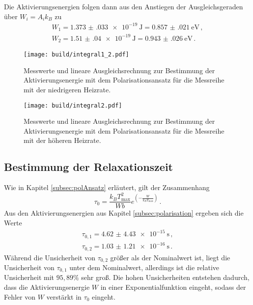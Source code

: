 Die Aktivierungsenergien folgen dann aus den Anstiegen der
Ausgleichsgeraden über $W_i=A_i k_B$ zu
\begin{align*}
	W_1=\SI{1.373(033)e-19}{\joule}=\SI{0.857(021)}{\eV} \,, \\
	W_2=\SI{1.51(04)e-19}{\joule}=\SI{0.943(026)}{\eV} \,.
\end{align*}

\begin{figure}
  \centering
  \texttt{[image: build/integral1\_2.pdf]}
  \caption{Messwerte und lineare Ausgleichsrechnung zur Bestimmung der Aktivierungsenergie mit dem Polarisationsansatz für
  die Messreihe mit der niedrigeren Heizrate.}
  \label{fig:integral1_2}
\end{figure}
\begin{figure}
  \centering
  \texttt{[image: build/integral2.pdf]}
  \caption{Messwerte und lineare Ausgleichsrechnung zur Bestimmung der Aktivierungsenergie mit dem Polarisationsansatz für
  die Messreihe mit der höheren Heizrate.}
  \label{fig:integral2}
\end{figure}

\subsection{Bestimmung der Relaxationszeit}
\label{subsec:relax}

Wie in Kapitel \ref{subsec:polAnsatz} erläutert, gilt der Zusammenhang
\begin{equation*}
	\tau_0=\frac{k_B T_{\text{max}}^2}{W b} e^{\left(-\frac{W}{k_B T_{\text{max}}}\right)} \,.
\end{equation*}
Aus den Aktivierungsenergien aus Kapitel \ref{subsec:polarisation} ergeben sich die Werte
\begin{align*}
	\tau_{0,1}=\SI{4.62(443)e-15}{\second} \,, \\
	\tau_{0,2}=\SI{1.03(121)e-16}{\second} \,.
\end{align*}
Während die Unsicherheit von $\tau_{0,2}$ größer als der Nominalwert ist, liegt die Unsicherheit von $\tau_{0,1}$ unter dem Nominalwert, allerdings ist die relative Unsicherheit mit $95{,}89\%$ sehr groß.
Die hohen Unsicherheiten entstehen dadurch, dass die Aktivierungsenergie $W$ in einer Exponentialfunktion eingeht, sodass der Fehler von $W$ verstärkt in $\tau_0$ eingeht.
